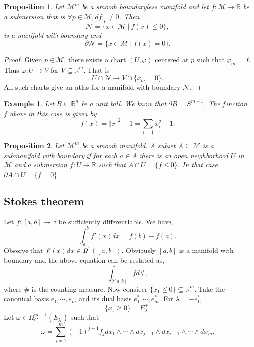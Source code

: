 \documentclass[10pt]{article}
\newtheorem{proposition}{Proposition}[section]
\newtheorem{example}{Example}[section]
\newcommand{\norm}[1]{\Vert #1 \Vert}
\newcommand{\R}[0]{\mathbb{R}}
\newcommand{\M}[0]{\mathcal{M}}
\newcommand{\maniN}[0]{\mathcal{N}}
\newcommand{\sep}[0]{\:|\:}
\begin{document}
\begin{proposition}
  Let $\M^m$ be a smooth boundaryless manifold and let $f:\M\to\R$ be a submersion that is $\forall p\in\M, df|_p\not=0$. Then 
  \begin{equation*}
    \maniN = \{x\in\M\sep f(x)\leq 0\},
  \end{equation*}
  is a manifold with boundary and 
  \begin{equation*}
    \partial\maniN = \{x\in\M\sep f(x) = 0\}.
  \end{equation*}
\end{proposition}

\begin{proof}
  Given $p\in\M$, there exists  a chart $(U,\varphi)$ centered at $p$ such that $\varphi_m = f$. Thus $\varphi:U\to V$ for $V\subseteq\R^m$. That is 
  \begin{equation*}
    U\cap\maniN \to V\cap\{x_m=0\}.
  \end{equation*}
  All such charts give an atlas for a manifold with boundary $\maniN$.
\end{proof}

\begin{example}
  Let $B\subseteq\R^n$ be a unit ball. We know that $\partial B = S^{m-1}$. The function $f$ above in this case is given by 
  \begin{equation*}
    f(x) = \norm{x}^2-1 = \sum_{i=1}x_i^2- 1.
  \end{equation*}
\end{example}

\begin{proposition}
  Let $\M^m$ be a smooth manifold. A subset $A\subseteq \M$ is a submanifold with boundary if for each $a\in A$ there is an open neighborhood $U$ in $\M$ and a submersion $f:U\to\R$ such that $A\cap U = \{f\leq 0\}$. In that case $\partial A\cap U = \{f=0\}$.
\end{proposition}

\subsection{Stokes theorem}

Let $f:[a,b]\to\R$ be sufficiently differentiable. We have,
\begin{equation*}
  \int_a^bf'(x)dx = f(b)-f(a).
\end{equation*}
Observe that $f'(x)dx\in\Omega^1([a,b])$. Obviously $[a,b]$ is a manifold with boundary and the above equation can be restated as,
\begin{equation*}
  \int_{\partial[a,b]}fd\#,
\end{equation*}
where $\#$ is the counting measure. Now consider $\{x_1\leq 0\}\subseteq\R^m$. Take the canonical basis $e_1,\cdots,e_m$ and its dual basis $e_1^*,\cdots,e_m^*$. For $\lambda = -e_1^*$,
\begin{equation*}
  \{x_1\geq 0\} = E_{\lambda}^+.
\end{equation*}
Let $\omega\in\Omega_C^{m-1}(E_\lambda^+)$ such that 
\begin{equation*}
  \omega = \sum_{j=1}^m(-1)^{j-1}f_j dx_1\wedge\cdots\wedge dx_{j-1}\wedge dx_{j+1}\wedge\cdots\wedge dx_m.
\end{equation*}
\end{document}
